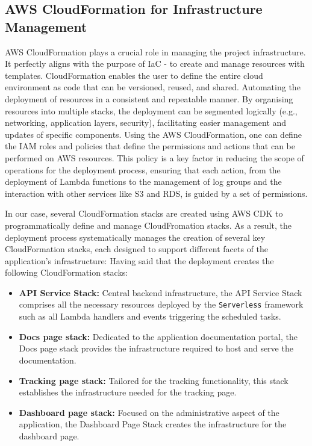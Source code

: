 \subsection{AWS CloudFormation for Infrastructure Management}
\label{subsec:aws-cloudformation-infrastructure}

\ac{AWS} CloudFormation plays a crucial role in managing the project infrastructure.
It perfectly aligns with the purpose of \ac{IaC} - to create and manage resources with templates.
CloudFormation enables the user to define the entire cloud environment as code that can be versioned, reused, and shared. 
Automating the deployment of resources in a consistent and repeatable manner.
By organising resources into multiple stacks, the deployment can be segmented logically (e.g., networking, application layers, security), facilitating easier management and updates of specific components.
Using the \ac{AWS} CloudFormation, one can define the \ac{IAM} roles and policies that define the permissions and actions that can be performed on \ac{AWS} resources.
This policy is a key factor in reducing the scope of operations for the deployment process, ensuring that each action, from the deployment of Lambda functions to the management of log groups and the interaction with other services like \ac{S3} and \ac{RDS}, is guided by a set of permissions. 

In our case, several CloudFormation stacks are created using \ac{AWS CDK} to programmatically define and manage CloudFromation stacks.
As a result, the deployment process systematically manages the creation of several key CloudFormation stacks, each designed to support different facets of the application's infrastructure:
Having said that the deployment creates the following CloudFormation stacks:
\begin{itemize}
    \item \textbf{API Service Stack:} Central backend infrastructure, the API Service Stack comprises all the necessary resources deployed by the \texttt{Serverless} framework such as all Lambda handlers and events triggering the scheduled tasks.
    \item \textbf{Docs page stack:} Dedicated to the application documentation portal, the Docs page stack provides the infrastructure required to host and serve the documentation. 
    \item \textbf{Tracking page stack:} Tailored for the tracking functionality, this stack establishes the infrastructure needed for the tracking page.
    \item \textbf{Dashboard page stack:}  Focused on the administrative aspect of the application, the Dashboard Page Stack creates the infrastructure for the dashboard page. 
\end{itemize}

